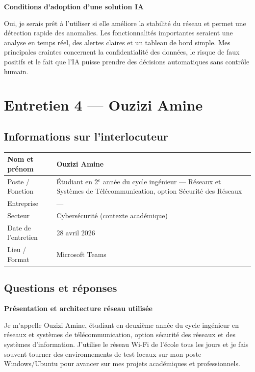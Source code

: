 \documentclass[12pt,a4paper]{report}
\begin{document}
\bigskip
\textbf{Conditions d'adoption d'une solution IA}

Oui, je serais pr\^{e}t \`{a} l'utiliser si elle am\'{e}liore la stabilit\'{e} du r\'{e}seau et permet une d\'{e}tection rapide des anomalies. Les fonctionnalit\'{e}s importantes seraient une analyse en temps r\'{e}el, des alertes claires et un tableau de bord simple. Mes principales craintes concernent la confidentialit\'{e} des donn\'{e}es, le risque de faux positifs et le fait que l'IA puisse prendre des d\'{e}cisions automatiques sans contr\^{o}le humain.

\clearpage

\section{Entretien 4 --- Ouzizi Amine}

\subsection*{Informations sur l'interlocuteur}

\begin{tabular}{@{}L{4cm} L{10.5cm}@{}}
  \hline
  Nom et pr\'{e}nom      & Ouzizi Amine \\
  \hline
  Poste / Fonction   & \'{E}tudiant en 2$^{e}$ ann\'{e}e du cycle ing\'{e}nieur --- R\'{e}seaux et Syst\`{e}mes de T\'{e}l\'{e}communication, option S\'{e}curit\'{e} des R\'{e}seaux \\
  \hline
  Entreprise         & --- \\
  \hline
  Secteur            & Cybers\'{e}curit\'{e} (contexte acad\'{e}mique) \\
  \hline
  Date de l'entretien & 28 avril 2026 \\
  \hline
  Lieu / Format      & Microsoft Teams \\
  \hline
\end{tabular}

\subsection*{Questions et réponses}

\textbf{Présentation et architecture réseau utilisée}

Je m'appelle Ouzizi Amine, \'{e}tudiant en deuxi\`{e}me ann\'{e}e du cycle ing\'{e}nieur en r\'{e}seaux et syst\`{e}mes de t\'{e}l\'{e}communication, option s\'{e}curit\'{e} des r\'{e}seaux et des syst\`{e}mes d'information. J'utilise le r\'{e}seau Wi-Fi de l'\'{e}cole tous les jours et je fais souvent tourner des environnements de test locaux sur mon poste Windows/Ubuntu pour avancer sur mes projets acad\'{e}miques et professionnels.
\end{document}
